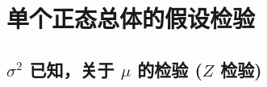\section{单个正态总体的假设检验}

\subsection{\texorpdfstring{$\sigma^2$}. 已知，关于 \texorpdfstring{$\mu$}. 的检验 (\texorpdfstring{$Z$}. 检验)}

